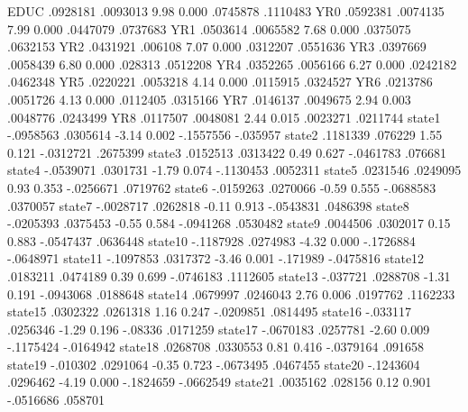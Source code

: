         EDUC {\VBAR}   .0928181   .0093013     9.98   0.000     .0745878    .1110483
         YR0 {\VBAR}   .0592381   .0074135     7.99   0.000     .0447079    .0737683
         YR1 {\VBAR}   .0503614   .0065582     7.68   0.000     .0375075    .0632153
         YR2 {\VBAR}   .0431921    .006108     7.07   0.000     .0312207    .0551636
         YR3 {\VBAR}   .0397669   .0058439     6.80   0.000      .028313    .0512208
         YR4 {\VBAR}   .0352265   .0056166     6.27   0.000     .0242182    .0462348
         YR5 {\VBAR}   .0220221   .0053218     4.14   0.000     .0115915    .0324527
         YR6 {\VBAR}   .0213786   .0051726     4.13   0.000     .0112405    .0315166
         YR7 {\VBAR}   .0146137   .0049675     2.94   0.003     .0048776    .0243499
         YR8 {\VBAR}   .0117507   .0048081     2.44   0.015     .0023271    .0211744
      state1 {\VBAR}  -.0958563   .0305614    -3.14   0.002    -.1557556    -.035957
      state2 {\VBAR}   .1181339    .076229     1.55   0.121    -.0312721    .2675399
      state3 {\VBAR}   .0152513   .0313422     0.49   0.627    -.0461783     .076681
      state4 {\VBAR}  -.0539071   .0301731    -1.79   0.074    -.1130453    .0052311
      state5 {\VBAR}   .0231546   .0249095     0.93   0.353    -.0256671    .0719762
      state6 {\VBAR}  -.0159263   .0270066    -0.59   0.555    -.0688583    .0370057
      state7 {\VBAR}  -.0028717   .0262818    -0.11   0.913    -.0543831    .0486398
      state8 {\VBAR}  -.0205393   .0375453    -0.55   0.584    -.0941268    .0530482
      state9 {\VBAR}   .0044506   .0302017     0.15   0.883    -.0547437    .0636448
     state10 {\VBAR}  -.1187928   .0274983    -4.32   0.000    -.1726884   -.0648971
     state11 {\VBAR}  -.1097853   .0317372    -3.46   0.001     -.171989   -.0475816
     state12 {\VBAR}   .0183211   .0474189     0.39   0.699    -.0746183    .1112605
     state13 {\VBAR}   -.037721   .0288708    -1.31   0.191    -.0943068    .0188648
     state14 {\VBAR}   .0679997   .0246043     2.76   0.006     .0197762    .1162233
     state15 {\VBAR}   .0302322   .0261318     1.16   0.247    -.0209851    .0814495
     state16 {\VBAR}   -.033117   .0256346    -1.29   0.196      -.08336    .0171259
     state17 {\VBAR}  -.0670183   .0257781    -2.60   0.009    -.1175424   -.0164942
     state18 {\VBAR}   .0268708   .0330553     0.81   0.416    -.0379164     .091658
     state19 {\VBAR}   -.010302   .0291064    -0.35   0.723    -.0673495    .0467455
     state20 {\VBAR}  -.1243604   .0296462    -4.19   0.000    -.1824659   -.0662549
     state21 {\VBAR}   .0035162    .028156     0.12   0.901    -.0516686     .058701
